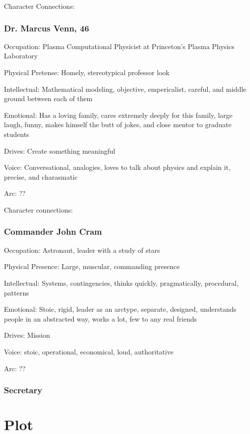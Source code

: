 Character Connections:
\subsubsection{Dr. Marcus Venn, 46}

Occupation: Plasma Computational Physicist at Princeton's Plasma Physics Laboratory

Physical Pretense: Homely, stereotypical professor look

Intellectual: Mathematical modeling, objective, empericalist, careful, and middle ground between each of them

Emotional: Has a loving family, cares extremely deeply for this family, large laugh, funny, makes himself the butt of jokes, and close mentor to graduate students

Drives: Create something meaningful

Voice: Conversational, analogies, loves to talk about physics and explain it, precise, and charasmatic

Arc: ??

Character connections:
\subsubsection{Commander John Cram}
Occupation: Astronaut, leader with a study of stars

Physical Presence: Large, muscular, commanding presence

Intellectual: Systems, contingencies, thinks quickly, pragmatically, procedural, patterns

Emotional: Stoic, rigid, leader as an arctype, separate, designed, understands people in an abstracted way, works a lot, few to any real friends

Drives: Mission

Voice: stoic, operational, economical, loud, authoritative

Arc: ??

\subsubsection{Secretary }
\section{Plot}
